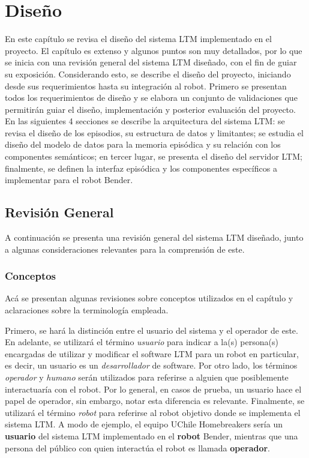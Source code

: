 \chapter{Diseño}\label{chapter:diseno}

En este capítulo se revisa el diseño del sistema LTM implementado en el proyecto. El capítulo es extenso y algunos puntos son muy detallados, por lo que se inicia con una revisión general del sistema LTM diseñado, con el fin de guiar su exposición. Considerando esto, se describe el diseño del proyecto, iniciando desde sus requerimientos hasta su integración al robot. Primero se presentan todos los requerimientos de diseño y se elabora un conjunto de validaciones que permitirán guiar el diseño, implementación y posterior evaluación del proyecto. En las siguientes 4 secciones se describe la arquitectura del sistema LTM: se revisa el diseño de los episodios, su estructura de datos y limitantes; se estudia el diseño del modelo de datos para la memoria episódica y su relación con los componentes semánticos; en tercer lugar, se presenta el diseño del servidor LTM; finalmente, se definen la interfaz episódica y los componentes específicos a implementar para el robot Bender.


\section{Revisión General}

A continuación se presenta una revisión general del sistema LTM diseñado, junto a algunas consideraciones relevantes para la comprensión de este.

\subsection{Conceptos}

Acá se presentan algunas revisiones sobre conceptos utilizados en el capítulo y aclaraciones sobre la terminología empleada.

Primero, se hará la distinción entre el usuario del sistema y el operador de este. En adelante, se utilizará el término \textit{usuario} para indicar a la(s) persona(s) encargadas de utilizar y modificar el software LTM para un robot en particular, es decir, un usuario es un \textit{desarrollador} de software. Por otro lado, los términos \textit{operador} y \textit{humano} serán utilizados para referirse a alguien que posiblemente interactuaría con el robot. Por lo general, en casos de prueba, un usuario hace el papel de operador, sin embargo, notar esta diferencia es relevante. Finalmente, se utilizará el término \textit{robot} para referirse al robot objetivo donde se implementa el sistema LTM. A modo de ejemplo, el equipo UChile Homebreakers sería un \textbf{usuario} del sistema LTM implementado en el \textbf{robot} Bender, mientras que una persona del público con quien interactúa el robot es llamada \textbf{operador}.

